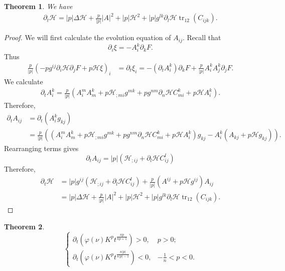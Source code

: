 \documentclass{amsart}
\newtheorem{theorem}{Theorem}
\theoremstyle{definition}
\theoremstyle{remark}
\numberwithin{equation}{section}
\begin{document}
\begin{theorem} We have
\begin{align*}
\partial_t\mathcal{H}= |p| \Delta \mathcal{H}+\frac{p}{|p|}| A |^2+ |p|  \mathcal{H}^2+ |p|  g^{lk}\partial_l\mathcal{H} \operatorname{tr}_{12}( C _{ijk}).
\end{align*}
\end{theorem}
\begin{proof}
We will first calculate the evolution equation of $ A _{ij}.$ Recall that $$\partial_i\xi=- A _i^k\partial_kF.$$ Thus
\begin{align*}
\frac{p}{|p|}\left(- p  g^{ij}\partial_i\mathcal{H}\partial_jF+ p  \mathcal{H}\xi\right)_i&=\partial_t\xi_i=-(\partial_t A _i^k)\partial_kF+\frac{p}{|p|} A _i^k A _j^k\partial_jF.
\end{align*}
We calculate
\begin{align*}
\partial_t A _i^k=\frac{p}{|p|}( A _i^m A _m^k+ p  \mathcal{H}_{;mi}g^{mk}+ p
g^{nm}\partial_n \mathcal{H} C _{mi}^k+ p  \mathcal{H} A _i^k).
\end{align*}
Therefore,
\begin{align*}
\partial_t A _{ij}&=\partial_t( A _i^kg_{kj})\\
&=\frac{p}{|p|}\left(\left( A _i^m A _m^k+ p  \mathcal{H}_{;mi}g^{mk}+ p
g^{nm}\partial_n \mathcal{H} C _{mi}^k+ p  \mathcal{H} A _i^k\right)g_{kj}- A _i^k
( A _{kj}+ p  \mathcal{H}g_{kj})\right).
\end{align*}
Rearranging terms gives
\[\partial_t  A _{ij}= |p|  (\mathcal{H}_{;ij}+  \partial_l\mathcal{H}  C _{ij}^l)\]
Therefore,
\begin{align*}
\partial_t\mathcal{H}&=|p|g^{ij}( \mathcal{H}_{;ij}+  \partial_l \mathcal{H} C ^l_{ij})+\frac{p}{|p|}( A ^{ij}+ p  \mathcal{H}g^{ij}) A _{ij}\\
&= |p| \Delta \mathcal{H}+\frac{p}{|p|}| A |^2+ |p|  \mathcal{H}^2+ |p|  g^{lk}\partial_l\mathcal{H} \operatorname{tr}_{12}( C _{ijk}).
\end{align*}
\end{proof}
\begin{theorem}
\[\left\{
  \begin{array}{ll}
    \partial_t \left(\varphi(\nu)K^pt^{\frac{n p }{n p +1}}\right)> 0, & p>0; \\
    \partial_t \left(\varphi(\nu)K^pt^{\frac{n |p| }{n |p| -1}}\right)<0, & -\frac{1}{n}<p<0.
  \end{array}
\right.
\]
\end{theorem}
\end{document}
